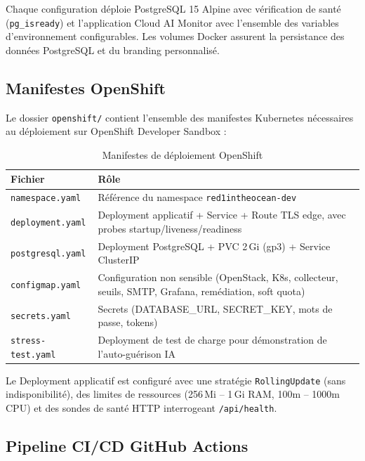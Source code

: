 \documentclass[11pt,a4paper]{report}
\begin{document}
Chaque configuration déploie PostgreSQL 15 Alpine avec vérification de santé
(\texttt{pg\_isready}) et l'application Cloud AI Monitor avec l'ensemble des
variables d'environnement configurables. Les volumes Docker assurent la
persistance des données PostgreSQL et du branding personnalisé.

\subsection{Manifestes OpenShift}

Le dossier \texttt{openshift/} contient l'ensemble des manifestes Kubernetes
nécessaires au déploiement sur OpenShift Developer Sandbox :

\begin{table}[H]
\centering
\renewcommand{\arraystretch}{1.3}
\begin{tabular}{|p{4.5cm}|p{9cm}|}
\hline
\textbf{Fichier} & \textbf{Rôle} \\
\hline
\texttt{namespace.yaml} & Référence du namespace \texttt{red1intheocean-dev} \\
\hline
\texttt{deployment.yaml} & Deployment applicatif + Service + Route TLS edge, avec probes startup/liveness/readiness \\
\hline
\texttt{postgresql.yaml} & Deployment PostgreSQL + PVC 2\,Gi (gp3) + Service ClusterIP \\
\hline
\texttt{configmap.yaml} & Configuration non sensible (OpenStack, K8s, collecteur, seuils, SMTP, Grafana, remédiation, soft quota) \\
\hline
\texttt{secrets.yaml} & Secrets (DATABASE\_URL, SECRET\_KEY, mots de passe, tokens) \\
\hline
\texttt{stress-test.yaml} & Deployment de test de charge pour démonstration de l'auto-guérison IA \\
\hline
\end{tabular}
\caption{Manifestes de déploiement OpenShift}
\end{table}

Le Deployment applicatif est configuré avec une stratégie \texttt{RollingUpdate}
(sans indisponibilité), des limites de ressources (256\,Mi – 1\,Gi RAM,
100m – 1000m CPU) et des sondes de santé HTTP interrogeant
\texttt{/api/health}.

\subsection{Pipeline CI/CD GitHub Actions}
\end{document}
